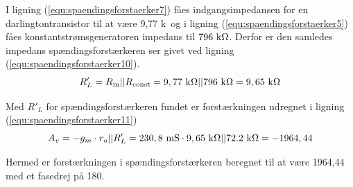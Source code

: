 I ligning (\ref{equ:spaendingsforstaerker7}) fåes indgangsimpedansen for en darlingtontransistor til at være 9,77 k\ohm~og i ligning (\ref{equ:spaendingsforstaerker5}) fåes konstantstrømsgeneratoren impedans til $796~\mathrm{k}\ohm$. Derfor er den samledes impedans spændingsforstærkeren ser givet ved ligning (\ref{equ:spaendingsforstaerker10}).
\begin{equation}
\label{equ:spaendingsforstaerker10}
R'_L = R_{\mathrm{in}}||R_{\mathrm{const}} = 9,77~\mathrm{k}\ohm || 796~\mathrm{k}\ohm = 9,65~\mathrm{k}\ohm
\end{equation}  

Med $R'_L$ for spændingsforstærkeren fundet er forstærkningen udregnet i ligning (\ref{equ:spaendingsforstaerker11})
\begin{equation}
\label{equ:spaendingsforstaerker11}
A_v = -g_m \cdot r_o || R'_L = 230,8~\mathrm{mS} \cdot 9,65~\mathrm{k}\ohm || 72.2~\mathrm{k}\ohm = -1964,44
\end{equation}

Hermed er forstærkningen i spændingsforstærkeren beregnet til at være 1964,44 med et fasedrej på 180\degree .